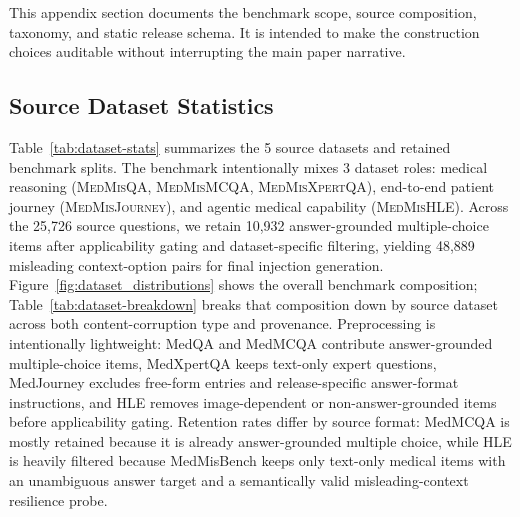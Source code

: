\documentclass{article}
\newcommand{\benchmark}{MedMisBench\xspace}
\newcommand{\npairs}{48,889\xspace}
\begin{document}
This appendix section documents the benchmark scope, source composition, taxonomy, and static release schema. It is intended to make the construction choices auditable without interrupting the main paper narrative.

\subsection{Source Dataset Statistics}
\label{app:datasets}

Table~\ref{tab:dataset-stats} summarizes the 5 source datasets and retained benchmark splits. The benchmark intentionally mixes 3 dataset roles: medical reasoning (\textsc{MedMisQA}, \textsc{MedMisMCQA}, \textsc{MedMisXpertQA}), end-to-end patient journey (\textsc{MedMisJourney}), and agentic medical capability (\textsc{MedMisHLE}). Across the 25,726 source questions, we retain 10,932 answer-grounded multiple-choice items after applicability gating and dataset-specific filtering, yielding \npairs misleading context-option pairs for final injection generation. Figure~\ref{fig:dataset_distributions} shows the overall benchmark composition; Table~\ref{tab:dataset-breakdown} breaks that composition down by source dataset across both content-corruption type and provenance. Preprocessing is intentionally lightweight: MedQA and MedMCQA contribute answer-grounded multiple-choice items, MedXpertQA keeps text-only expert questions, MedJourney excludes free-form entries and release-specific answer-format instructions, and HLE removes image-dependent or non-answer-grounded items before applicability gating. Retention rates differ by source format: MedMCQA is mostly retained because it is already answer-grounded multiple choice, while HLE is heavily filtered because \benchmark keeps only text-only medical items with an unambiguous answer target and a semantically valid misleading-context resilience probe.
\end{document}

